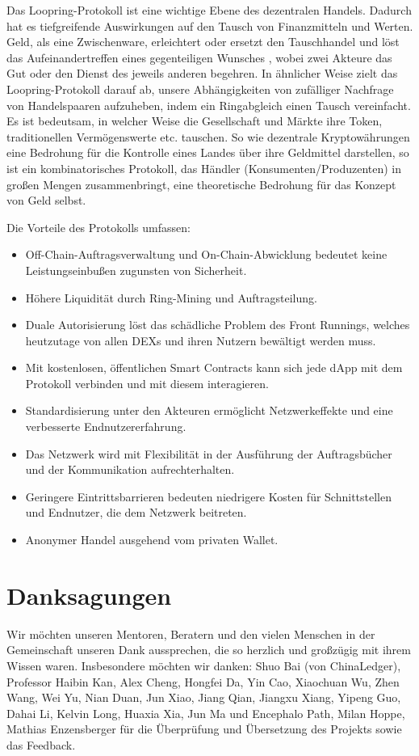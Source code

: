 \documentclass[UTF8,nofonts]{article}
\begin{document}
\begin{multicols}{2}
Das Loopring-Protokoll ist eine wichtige Ebene des dezentralen Handels. Dadurch hat es tiefgreifende Auswirkungen auf den Tausch von Finanzmitteln und Werten. Geld, als eine Zwischenware, erleichtert oder ersetzt den Tauschhandel und löst das Aufeinandertreffen eines gegenteiligen Wunsches \cite{unenumerated2006}, wobei zwei Akteure das Gut oder den Dienst des jeweils anderen begehren. In ähnlicher Weise zielt das Loopring-Protokoll darauf ab, unsere Abhängigkeiten von zufälliger Nachfrage von Handelspaaren aufzuheben, indem ein Ringabgleich einen Tausch vereinfacht. Es ist bedeutsam, in welcher Weise die Gesellschaft und Märkte ihre Token, traditionellen Vermögenswerte etc. tauschen. So wie dezentrale Kryptowährungen eine Bedrohung für die Kontrolle eines Landes über ihre Geldmittel darstellen, so ist ein kombinatorisches Protokoll, das Händler (Konsumenten/Produzenten) in großen Mengen zusammenbringt, eine theoretische Bedrohung für das Konzept von Geld selbst.

Die Vorteile des Protokolls umfassen:

\begin{itemize}
	\item Off-Chain-Auftragsverwaltung und On-Chain-Abwicklung bedeutet keine Leistungseinbußen zugunsten von Sicherheit.
	\item Höhere Liquidität durch Ring-Mining und Auftragsteilung.
	\item Duale Autorisierung löst das schädliche Problem des Front Runnings, welches heutzutage von allen DEXs und ihren Nutzern bewältigt werden muss.
	\item Mit kostenlosen, öffentlichen Smart Contracts kann sich jede dApp mit dem Protokoll verbinden und mit diesem interagieren.
	\item Standardisierung unter den Akteuren ermöglicht Netzwerkeffekte und eine verbesserte Endnutzererfahrung.
	\item Das Netzwerk wird mit Flexibilität in der Ausführung der Auftragsbücher und der Kommunikation aufrechterhalten.
	\item Geringere Eintrittsbarrieren bedeuten niedrigere Kosten für Schnittstellen und Endnutzer, die dem Netzwerk beitreten.
	\item Anonymer Handel ausgehend vom privaten Wallet.
\end{itemize}

\section{Danksagungen}
Wir möchten unseren Mentoren, Beratern und den vielen Menschen in der Gemeinschaft unseren Dank aussprechen, die so herzlich und großzügig mit ihrem Wissen waren. Insbesondere möchten wir danken: Shuo Bai (von ChinaLedger), Professor Haibin Kan, Alex Cheng, Hongfei Da, Yin Cao, Xiaochuan Wu, Zhen Wang, Wei Yu, Nian Duan, Jun Xiao, Jiang Qian, Jiangxu Xiang, Yipeng Guo, Dahai Li, Kelvin Long, Huaxia Xia, Jun Ma und Encephalo Path, Milan Hoppe, Mathias Enzensberger für die Überprüfung und Übersetzung des Projekts sowie das Feedback.



\end{multicols}
\end{document}
